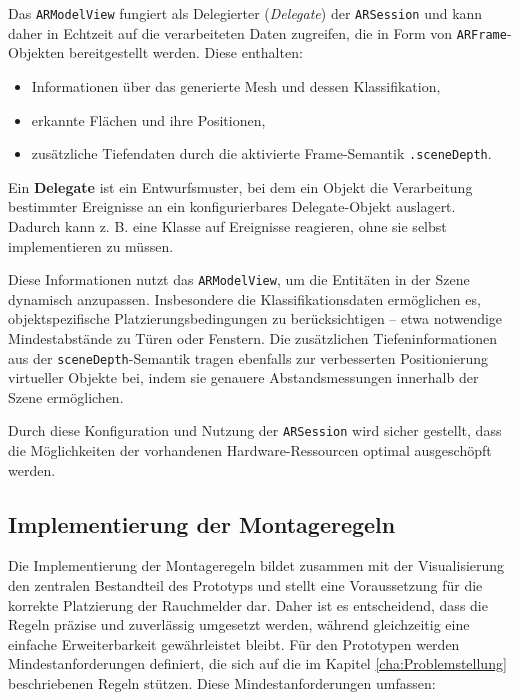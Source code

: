 Das \texttt{ARModelView} fungiert als Delegierter (\emph{Delegate}) der \texttt{ARSession} und kann daher in Echtzeit auf die verarbeiteten Daten zugreifen, die in Form von \texttt{ARFrame}-Objekten bereitgestellt werden. Diese enthalten:

\begin{itemize}
    \item Informationen über das generierte Mesh und dessen Klassifikation,
    \item erkannte Flächen und ihre Positionen,
    \item zusätzliche Tiefendaten durch die aktivierte Frame-Semantik \texttt{.sceneDepth}.
\end{itemize}

\begin{tcolorbox}[colback=THAi-Blue!20!white, colframe=THAi-Blue]
    Ein \textbf{Delegate} ist ein Entwurfsmuster, bei dem ein Objekt die Verarbeitung bestimmter Ereignisse an ein konfigurierbares Delegate-Objekt auslagert. Dadurch kann z. B. eine Klasse auf Ereignisse reagieren, ohne sie selbst implementieren zu müssen. \cite{appledevdoc}
\end{tcolorbox}  

Diese Informationen nutzt das \texttt{ARModelView}, um die Entitäten in der Szene dynamisch anzupassen. Insbesondere die Klassifikationsdaten ermöglichen es, objektspezifische Platzierungsbedingungen zu berücksichtigen – etwa notwendige Mindestabstände zu Türen oder Fenstern. Die zusätzlichen Tiefeninformationen aus der \texttt{sceneDepth}-Semantik tragen ebenfalls zur verbesserten Positionierung virtueller Objekte bei, indem sie genauere Abstandsmessungen innerhalb der Szene ermöglichen.

Durch diese Konfiguration und Nutzung der \texttt{ARSession} wird sicher gestellt, dass die Möglichkeiten der vorhandenen Hardware-Ressourcen optimal ausgeschöpft werden.

\subsection{Implementierung der Montageregeln}\label{sec:ImplMontageregeln}

Die Implementierung der Montageregeln bildet zusammen mit der Visualisierung den zentralen Bestandteil des Prototyps und stellt eine Voraussetzung für die korrekte Platzierung der Rauchmelder dar. Daher ist es entscheidend, dass die Regeln präzise und zuverlässig umgesetzt werden, während gleichzeitig eine einfache Erweiterbarkeit gewährleistet bleibt. Für den Prototypen werden Mindestanforderungen definiert, die sich auf die im Kapitel \ref{cha:Problemstellung} beschriebenen Regeln stützen. Diese Mindestanforderungen umfassen:

